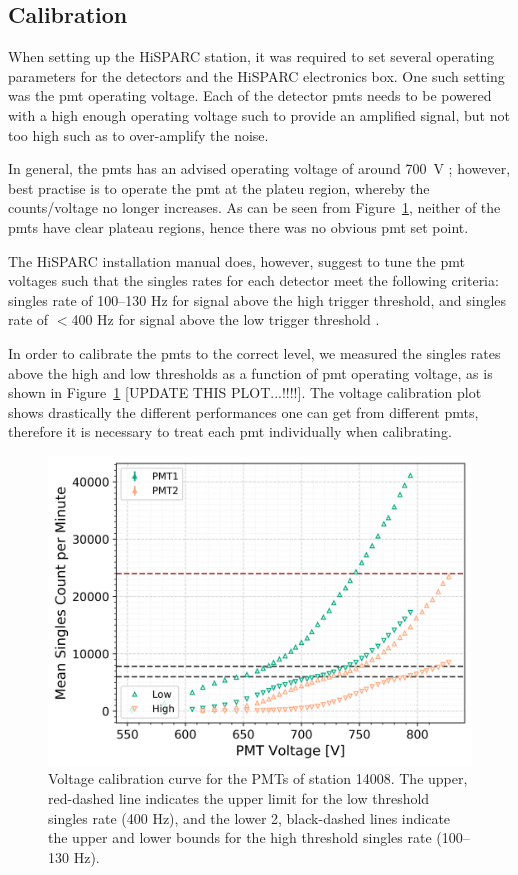 \subsection{Calibration}

When setting up the HiSPARC station, it was required to set several operating parameters for the detectors and the HiSPARC electronics box. One such setting was the \gls{pmt} operating voltage. Each of the detector \glspl{pmt} needs to be powered with a high enough operating voltage such to provide an amplified signal, but not too high such as to over-amplify the noise.

In general, the \glspl{pmt} has an advised operating voltage of around 700~V \citep{fokkema_hisparc_2019}; however, best practise is to operate the \gls{pmt} at the plateu region, whereby the counts/voltage no longer increases. As can be seen from Figure~\ref{fig:PMT_cal}, neither of the \glspl{pmt} have clear plateau regions, hence there was no obvious \gls{pmt} set point.

The HiSPARC installation manual does, however, suggest to tune the \gls{pmt} voltages such that the singles rates for each detector meet the following criteria: singles rate of 100--130 Hz for signal above the high trigger threshold, and singles rate of $<$400 Hz for signal above the low trigger threshold \citep{fokkema_hisparc_2019}.

In order to calibrate the \glspl{pmt} to the correct level, we measured the singles rates above the high and low thresholds as a function of \gls{pmt} operating voltage, as is shown in Figure~\ref{fig:PMT_cal} [UPDATE THIS PLOT...!!!!]. The voltage calibration plot shows drastically the different performances one can get from different \glspl{pmt}, therefore it is necessary to treat each \gls{pmt} individually when calibrating.

\begin{figure}
	\centering
	\includegraphics[width=0.75\columnwidth]{both_PMTs_post_NIM.png}
	\caption{Voltage calibration curve for the PMTs of station 14008. The upper, red-dashed line indicates the upper limit for the low threshold singles rate (400 Hz), and the lower 2, black-dashed lines indicate the upper and lower bounds for the high threshold singles rate (100--130 Hz).}
	\label{fig:PMT_cal}
\end{figure}




